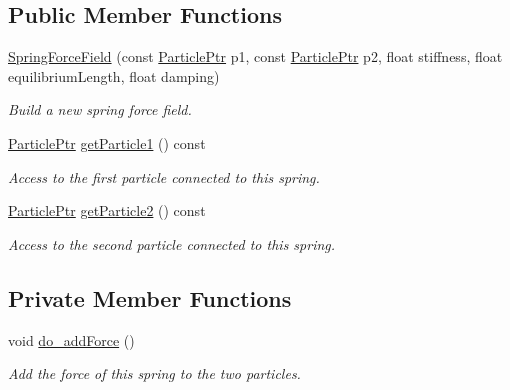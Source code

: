 \subsection*{Public Member Functions}
\begin{DoxyCompactItemize}
\item 
\hyperlink{classSpringForceField_a1b38a20f9878bd9ed51fd9bb996a7870}{Spring\+Force\+Field} (const \hyperlink{Particle_8hpp_a9a7abc8635002993537b61ef2c857fdd}{Particle\+Ptr} p1, const \hyperlink{Particle_8hpp_a9a7abc8635002993537b61ef2c857fdd}{Particle\+Ptr} p2, float stiffness, float equilibrium\+Length, float damping)
\begin{DoxyCompactList}\small\item\em Build a new spring force field. \end{DoxyCompactList}\item 
\hyperlink{Particle_8hpp_a9a7abc8635002993537b61ef2c857fdd}{Particle\+Ptr} \hyperlink{classSpringForceField_a0c216bb074d82868a63578feae959836}{get\+Particle1} () const 
\begin{DoxyCompactList}\small\item\em Access to the first particle connected to this spring. \end{DoxyCompactList}\item 
\hyperlink{Particle_8hpp_a9a7abc8635002993537b61ef2c857fdd}{Particle\+Ptr} \hyperlink{classSpringForceField_a80a9c5c14be0d14d15651d76098a4bf2}{get\+Particle2} () const 
\begin{DoxyCompactList}\small\item\em Access to the second particle connected to this spring. \end{DoxyCompactList}\end{DoxyCompactItemize}
\subsection*{Private Member Functions}
\begin{DoxyCompactItemize}
\item 
void \hyperlink{classSpringForceField_a09e9e100a1947a43fdc1c9487d72a08e}{do\+\_\+add\+Force} ()
\begin{DoxyCompactList}\small\item\em Add the force of this spring to the two particles. \end{DoxyCompactList}\end{DoxyCompactItemize}
